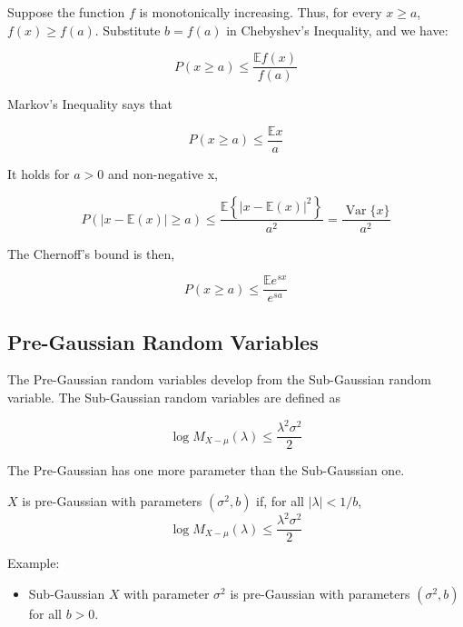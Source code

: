 Suppose the function $f$ is monotonically increasing.
Thus, for every $x \geq a$, $f(x) \geq f(a)$. 
Substitute $b = f(a)$ in Chebyshev's Inequality, and we have:

\begin{equation}
  P(x \geq a) \leq \frac{\mathbb{E}f(x)}{f(a)}
\end{equation}

Markov's Inequality says that

\begin{equation}
  P(x \geq a) \leq \frac{\mathbb{E}x}{a}
\end{equation}

It holds for $a >0$ and non-negative x, 

\begin{equation}
  P(|x-\mathbb{E}(x)| \geq a) \leq \frac{\mathbb{E}\left\{|x-\mathbb{E}(x)|^{2}\right\}}{a^{2}}=\frac{\operatorname{Var}\{x\}}{a^{2}}
\end{equation}

The Chernoff's bound is then,

\begin{equation}
  P(x \geq a) \leq \frac{\mathbb{E}e^{sx}}{e^{sa}}
\end{equation}

\subsection{Pre-Gaussian Random Variables}
The Pre-Gaussian random variables develop from the Sub-Gaussian random variable.
The Sub-Gaussian random variables are defined as 

\begin{equation}
  \log M_{X-\mu}(\lambda) \leq \frac{\lambda^{2} \sigma^{2}}{2}
\end{equation}

The Pre-Gaussian has one more parameter than the Sub-Gaussian one.

\begin{definition} \cite*{Bartlett:2020}
  $X$ is pre-Gaussian with parameters $(\sigma^2,b)$ if, for all $\left| \lambda \right| < 1/b$,
  \begin{equation}
    \log M_{X-\mu}(\lambda) \leq \frac{\lambda^{2} \sigma^{2}}{2}
  \end{equation}
\end{definition}

Example:

\begin{itemize}
  \item Sub-Gaussian $X$ with parameter $\sigma^2$ is pre-Gaussian with parameters $(\sigma^2, b)$ for all $b>0$.
\end{itemize}

